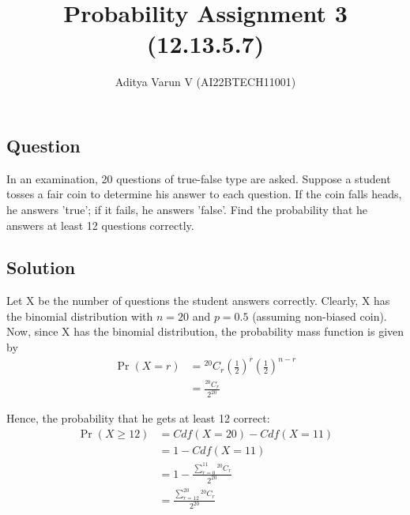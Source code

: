 \documentclass[12pt,twocolumn,notitlepage]{article}
\title{Probability Assignment 3 (12.13.5.7)}
\author{Aditya Varun V (AI22BTECH11001)}
\date{}
\providecommand{\pr}[1]{\ensuremath{\Pr\left(#1\right)}}
\providecommand{\brak}[1]{\ensuremath{\left(#1\right)}}
\newcommand*{\comb}[2]{{}^{#1}C_{#2}}
\begin{document}
\maketitle
\subsection*{Question}
In an examination, 20 questions of true-false type are asked. Suppose a student tosses a fair coin to determine his answer to each question. If the coin falls heads, he answers 'true'; if it fails, he answers 'false'. Find the probability that he answers at least 12 questions correctly.


\subsection*{Solution}

Let X be the number of questions the student answers correctly. Clearly, X has the binomial distribution with $n=20$ and $p=0.5$ (assuming non-biased coin). Now, since X has the binomial distribution, the probability mass function is given by
\begin{align}
    \pr{X=r} &= \comb{20}{r}\brak{\frac{1}{2}}^{r}\brak{\frac{1}{2}}^{n-r}\\ 
    &=\frac{\comb{20}{r}}{2^{20}}
\end{align}

Hence, the probability that he gets at least 12 correct:  
\begin{align}
    \pr{X\geq 12} &= Cdf\brak{X=20} - Cdf\brak{X=11}\\
    &= 1 - Cdf\brak{X=11}\\
    &= 1 - \frac{\sum_{r=0}^{11} \comb{20}{r}}{2^{20}}\\
    &= \frac{\sum_{r=12}^{20} \comb{20}{r}}{2^{20}}
\end{align}
\end{document}
